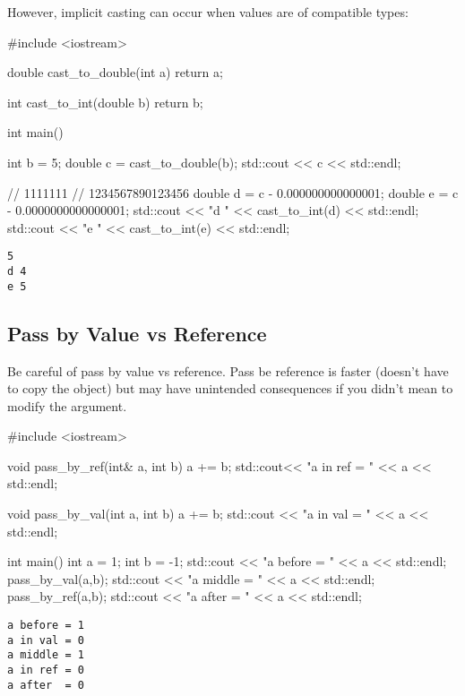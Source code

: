 \documentclass[12pt,letterpaper,twoside]{article}
\begin{document}
\newpage
However, implicit casting can occur when values are of compatible types:
\begin{cpp}
#include <iostream>

double cast_to_double(int a){
	return a;
}

int cast_to_int(double b){
	return b;
}

int main() {
  int b = 5;
  double c = cast_to_double(b);
  std::cout << c << std::endl;
  
  //                        1111111 
  //               1234567890123456
  double d = c - 0.000000000000001;
  double e = c - 0.0000000000000001;
  std::cout << "d " << cast_to_int(d) << std::endl;
  std::cout << "e " << cast_to_int(e) << std::endl;
}
\end{cpp}
\vspace{-3ex}
{\footnotesize
\begin{verbatim}
5
d 4
e 5
\end{verbatim}
}

\subsection{Pass by Value vs Reference}

Be careful of pass by value vs reference.  Pass be reference is faster (doesn't have to copy the object) but may have unintended consequences if you didn't mean to modify the argument.

\begin{cpp}
#include <iostream>

void pass_by_ref(int& a, int b){
	a += b;
	std::cout<< "a in ref = " << a << std::endl;
}

void pass_by_val(int a, int b){
	a += b;
	std::cout << "a in val = " << a << std::endl;
}

int main() {
  int a = 1;
  int b = -1;
  std::cout << "a before = " << a << std::endl;
  pass_by_val(a,b);
  std::cout << "a middle = " << a << std::endl;
  pass_by_ref(a,b);
  std::cout << "a after  = " << a << std::endl;
}
\end{cpp}
\vspace{-3ex}
{\footnotesize
\begin{verbatim}
a before = 1
a in val = 0
a middle = 1
a in ref = 0
a after  = 0
\end{verbatim}
}
\end{document}
